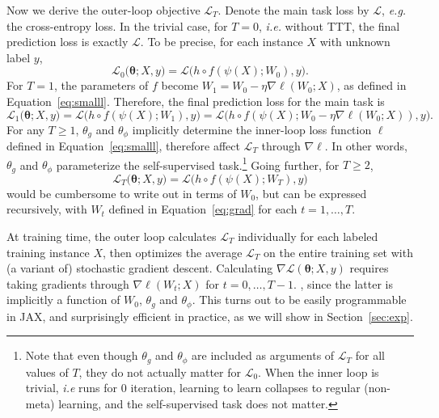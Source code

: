 \documentclass{article}
\newcommand{\scrL}{\mathcal{L}}
\begin{document}
Now we derive the outer-loop objective $\scrL_T$.
Denote the main task loss by $\scrL$, \textit{e.g.} the cross-entropy loss.
In the trivial case, for $T=0$, \textit{i.e.} without TTT, the final prediction loss is exactly $\scrL$.
To be precise, for each instance $X$ with unknown label $y$,
\begin{equation}
\scrL_0 \big( \boldsymbol{\theta}; X, y \big) 
= \scrL \big( h\circ f(\psi(X); W_0), y \big).
\end{equation}
For $T=1$, the parameters of $f$ become $W_1 = W_0 - \eta\nabla\ell(W_0; X)$, as defined in Equation~\ref{eq:smalll}.
Therefore, the final prediction loss for the main task is
\begin{equation}
\label{eq:bigl}
\scrL_1\big( \boldsymbol{\theta}; X, y \big) = 
\scrL\big( h\circ f\left(\psi(X); W_1\right), y \big)
= \scrL\big( h\circ f\left(\psi(X); W_0 - \eta\nabla\ell(W_0; X)\right), y \big).
\end{equation}
For any $T\geq 1$, $\theta_g$ and $\theta_\phi$ implicitly determine the inner-loop loss function $\ell$ defined in Equation~\ref{eq:smalll}, therefore affect $\scrL_T$ through $\nabla\ell$.
In other words, $\theta_g$ and $\theta_\phi$ parameterize the self-supervised task.\footnote{Note that even though $\theta_g$ and $\theta_\phi$ are included as arguments of $\scrL_T$ for all values of $T$, they do not actually matter for $\scrL_0$.
When the inner loop is trivial, \textit{i.e} runs for 0 iteration, learning to learn collapses to regular (non-meta) learning, and the self-supervised task does not matter.
}
Going further, for $T \geq 2$, 
\begin{equation}
    \scrL_T \big( \boldsymbol{\theta}; X, y \big) =
    \scrL\big( h\circ f\left(\psi(X); W_T\right), y \big)
\end{equation}
would be cumbersome to write out in terms of $W_0$, but can be expressed recursively, with $W_t$ defined in Equation~\ref{eq:grad} for each $t=1,\dots,T$.

At training time, the outer loop calculates $\scrL_T$ individually for each labeled training instance $X$, then optimizes the average $\scrL_T$ on the entire training set with (a variant of) stochastic gradient descent. 
Calculating $\nabla\scrL(\boldsymbol{\theta}; X, y)$ requires taking gradients through $\nabla \ell(W_t; X)$ for $t=0,\dots,T-1$.
, since the latter is implicitly a function of $W_0$, $\theta_g$ and $\theta_\phi$.
This turns out to be easily programmable in JAX, and surprisingly efficient in practice, as we will show in Section~\ref{sec:exp}.
\end{document}
